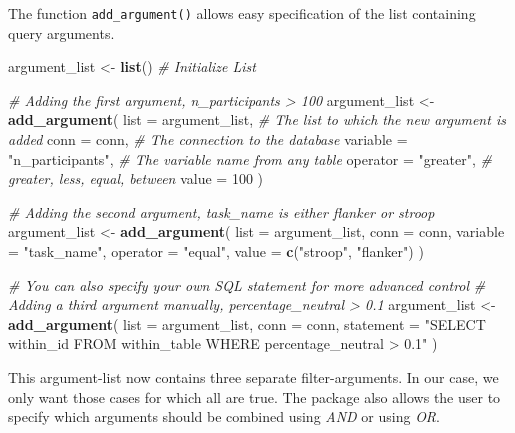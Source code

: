 \documentclass[
  man,floatsintext]{apa6}
\newenvironment{Shaded}{\begin{snugshade}}{\end{snugshade}}
\newcommand{\AttributeTok}[1]{\textcolor[rgb]{0.13,0.29,0.53}{#1}}
\newcommand{\CommentTok}[1]{\textcolor[rgb]{0.56,0.35,0.01}{\textit{#1}}}
\newcommand{\DecValTok}[1]{\textcolor[rgb]{0.00,0.00,0.81}{#1}}
\newcommand{\FunctionTok}[1]{\textcolor[rgb]{0.13,0.29,0.53}{\textbf{#1}}}
\newcommand{\NormalTok}[1]{#1}
\newcommand{\OtherTok}[1]{\textcolor[rgb]{0.56,0.35,0.01}{#1}}
\newcommand{\StringTok}[1]{\textcolor[rgb]{0.31,0.60,0.02}{#1}}
\begin{document}
The function \texttt{add\_argument()} allows easy specification of the list containing query arguments.

\begin{Shaded}
\begin{Highlighting}[]
\NormalTok{argument\_list }\OtherTok{\textless{}{-}} \FunctionTok{list}\NormalTok{() }\CommentTok{\# Initialize List}

\CommentTok{\# Adding the first argument, n\_participants \textgreater{} 100}
\NormalTok{argument\_list }\OtherTok{\textless{}{-}} \FunctionTok{add\_argument}\NormalTok{(}
  \AttributeTok{list =}\NormalTok{ argument\_list, }\CommentTok{\# The list to which the new argument is added}
  \AttributeTok{conn =}\NormalTok{ conn, }\CommentTok{\# The connection to the database}
  \AttributeTok{variable =} \StringTok{"n\_participants"}\NormalTok{, }\CommentTok{\# The variable name from any table}
  \AttributeTok{operator =} \StringTok{"greater"}\NormalTok{, }\CommentTok{\# greater, less, equal, between}
  \AttributeTok{value =} \DecValTok{100} 
\NormalTok{)}

\CommentTok{\# Adding the second argument, task\_name is either flanker or stroop}
\NormalTok{argument\_list }\OtherTok{\textless{}{-}} \FunctionTok{add\_argument}\NormalTok{(}
  \AttributeTok{list =}\NormalTok{ argument\_list,}
  \AttributeTok{conn =}\NormalTok{ conn,}
  \AttributeTok{variable =} \StringTok{"task\_name"}\NormalTok{,}
  \AttributeTok{operator =} \StringTok{"equal"}\NormalTok{,}
  \AttributeTok{value =} \FunctionTok{c}\NormalTok{(}\StringTok{"stroop"}\NormalTok{, }\StringTok{"flanker"}\NormalTok{)}
\NormalTok{)}

\CommentTok{\# You can also specify your own SQL statement for more advanced control}
\CommentTok{\# Adding a third argument manually, percentage\_neutral \textgreater{} 0.1}
\NormalTok{argument\_list }\OtherTok{\textless{}{-}} \FunctionTok{add\_argument}\NormalTok{(}
  \AttributeTok{list =}\NormalTok{ argument\_list,}
  \AttributeTok{conn =}\NormalTok{ conn,}
  \AttributeTok{statement =} \StringTok{"SELECT within\_id FROM within\_table WHERE percentage\_neutral \textgreater{} 0.1"}
\NormalTok{)}
\end{Highlighting}
\end{Shaded}

This argument-list now contains three separate filter-arguments. In our case, we only want those cases for which all are true. The package also allows the user to specify which arguments should be combined using \emph{AND} or using \emph{OR}.
\end{document}
